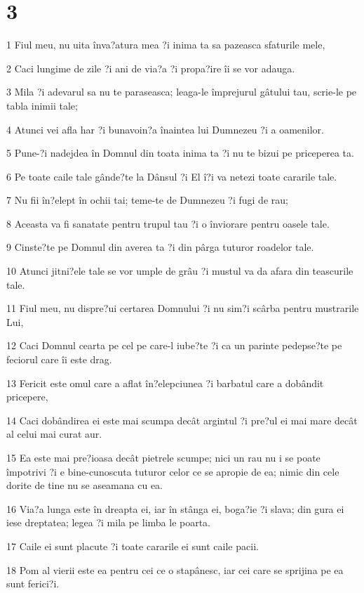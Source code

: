 \chapter{3}

\par 1 Fiul meu, nu uita înva?atura mea ?i inima ta sa pazeasca sfaturile mele,
\par 2 Caci lungime de zile ?i ani de via?a ?i propa?ire îi se vor adauga.
\par 3 Mila ?i adevarul sa nu te paraseasca; leaga-le împrejurul gâtului tau, scrie-le pe tabla inimii tale;
\par 4 Atunci vei afla har ?i bunavoin?a înaintea lui Dumnezeu ?i a oamenilor.
\par 5 Pune-?i nadejdea în Domnul din toata inima ta ?i nu te bizui pe priceperea ta.
\par 6 Pe toate caile tale gânde?te la Dânsul ?i El î?i va netezi toate cararile tale.
\par 7 Nu fii în?elept în ochii tai; teme-te de Dumnezeu ?i fugi de rau;
\par 8 Aceasta va fi sanatate pentru trupul tau ?i o înviorare pentru oasele tale.
\par 9 Cinste?te pe Domnul din averea ta ?i din pârga tuturor roadelor tale.
\par 10 Atunci jitni?ele tale se vor umple de grâu ?i mustul va da afara din teascurile tale.
\par 11 Fiul meu, nu dispre?ui certarea Domnului ?i nu sim?i scârba pentru mustrarile Lui,
\par 12 Caci Domnul cearta pe cel pe care-l iube?te ?i ca un parinte pedepse?te pe feciorul care îi este drag.
\par 13 Fericit este omul care a aflat în?elepciunea ?i barbatul care a dobândit pricepere,
\par 14 Caci dobândirea ei este mai scumpa decât argintul ?i pre?ul ei mai mare decât al celui mai curat aur.
\par 15 Ea este mai pre?ioasa decât pietrele scumpe; nici un rau nu i se poate împotrivi ?i e bine-cunoscuta tuturor celor ce se apropie de ea; nimic din cele dorite de tine nu se aseamana cu ea.
\par 16 Via?a lunga este în dreapta ei, iar în stânga ei, boga?ie ?i slava; din gura ei iese dreptatea; legea ?i mila pe limba le poarta.
\par 17 Caile ei sunt placute ?i toate cararile ei sunt caile pacii.
\par 18 Pom al vierii este ea pentru cei ce o stapânesc, iar cei care se sprijina pe ea sunt ferici?i.
